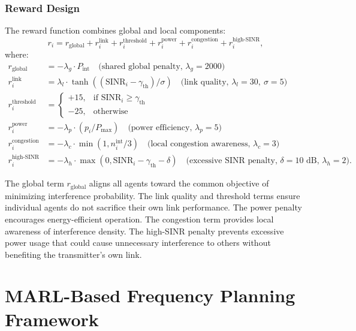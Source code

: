 \documentclass[conference]{IEEEtran}
\begin{document}
\subsubsection{Reward Design}
The reward function combines global and local components:
\begin{equation}
r_i = r_{\text{global}} + r_i^{\text{link}} + r_i^{\text{threshold}} + r_i^{\text{power}} + r_i^{\text{congestion}} + r_i^{\text{high-SINR}},
\label{eq:reward}
\end{equation}
where:
\begin{align}
r_{\text{global}} &= -\lambda_g \cdot P_{\text{int}} \quad \text{(shared global penalty, } \lambda_g = 2000\text{)} \\
r_i^{\text{link}} &= \lambda_l \cdot \tanh((\text{SINR}_i - \gamma_{\text{th}})/\sigma) \quad \text{(link quality, } \lambda_l = 30,\ \sigma = 5\text{)} \\
r_i^{\text{threshold}} &= \begin{cases} +15, & \text{if } \text{SINR}_i \geq \gamma_{\text{th}} \\ -25, & \text{otherwise} \end{cases} \\
r_i^{\text{power}} &= -\lambda_p \cdot (p_i / P_{\max}) \quad \text{(power efficiency, } \lambda_p = 5\text{)} \\
r_i^{\text{congestion}} &= -\lambda_c \cdot \min(1, n_i^{\text{int}}/3) \quad \text{(local congestion awareness, } \lambda_c = 3\text{)} \\
r_i^{\text{high-SINR}} &= -\lambda_h \cdot \max(0, \text{SINR}_i - \gamma_{\text{th}} - \delta) \quad \text{(excessive SINR penalty, } \delta = 10\text{ dB, } \lambda_h = 2\text{)}.
\end{align}

The global term $r_{\text{global}}$ aligns all agents toward the common objective of minimizing interference probability. The link quality and threshold terms ensure individual agents do not sacrifice their own link performance. The power penalty encourages energy-efficient operation. The congestion term provides local awareness of interference density. The high-SINR penalty prevents excessive power usage that could cause unnecessary interference to others without benefiting the transmitter's own link.

\section{MARL-Based Frequency Planning Framework}
\end{document}
